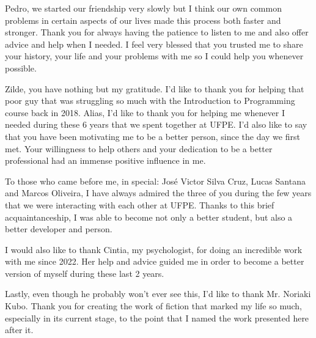 \begin{spacing}{1.0}
Pedro, we started our friendship very slowly but I think our own common problems in certain aspects of our lives made this process both faster and stronger. Thank you for always having the patience to listen to me and also offer advice and help when I needed. I feel very blessed that you trusted me to share your history, your life and your problems with me so I could help you whenever possible.

Zilde, you have nothing but my gratitude. I'd like to thank you for helping that poor guy that was struggling so much with the Introduction to Programming course back in 2018. Alias, I'd like to thank you for helping me whenever I needed during these 6 years that we spent together at UFPE. I'd also like to say that you have been motivating me to be a better person, since the day we first met. Your willingness to help others and your dedication to be a better professional had an immense positive influence in me.

To those who came before me, in special: José Victor Silva Cruz, Lucas Santana and Marcos Oliveira, I have always admired the three of you during the few years that we were interacting with each other at UFPE. Thanks to this brief acquaintanceship, I was able to become not only a better student, but also a better developer and person. 

I would also like to thank Cintia, my psychologist, for doing an incredible work with me since 2022. Her help and advice guided me in order to become a better version of myself during these last 2 years.

Lastly, even though he probably won't ever see this, I'd like to thank Mr. Noriaki Kubo. Thank you for creating the work of fiction that marked my life so much, especially in its current stage, to the point that I named the work presented here after it.
    
\clearpage
\end{spacing}